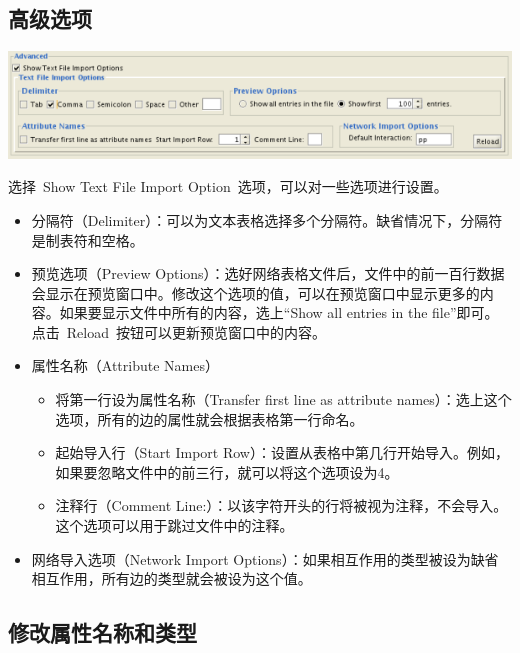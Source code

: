 \subsection{高级选项}
\begin{center}
 \includegraphics[width=\textwidth]{images/network_import_advanced.png} 
\end{center}
选择~Show Text File Import Option~选项，可以对一些选项进行设置。
\begin{itemize}
\item 分隔符（Delimiter）：可以为文本表格选择多个分隔符。缺省情况下，分隔符是制表符和空格。
\item 预览选项（Preview Options）：选好网络表格文件后，文件中的前一百行数据会显示在预览窗口中。修改这个选项的值，可以在预览窗口中显示更多的内容。如果要显示文件中所有的内容，选上``Show all entries in the file''即可。点击~Reload~按钮可以更新预览窗口中的内容。
\item 属性名称（Attribute Names）
\begin{itemize}
\item 将第一行设为属性名称（Transfer first line as attribute names）：选上这个选项，所有的边的属性就会根据表格第一行命名。
\item 起始导入行（Start Import Row）：设置从表格中第几行开始导入。例如，如果要忽略文件中的前三行，就可以将这个选项设为4。
\item 注释行（Comment Line:）：以该字符开头的行将被视为注释，不会导入。这个选项可以用于跳过文件中的注释。
\end{itemize}
\item 网络导入选项（Network Import Options）：如果相互作用的类型被设为缺省相互作用，所有边的类型就会被设为这个值。
\end{itemize}
 
\subsection{修改属性名称和类型}

